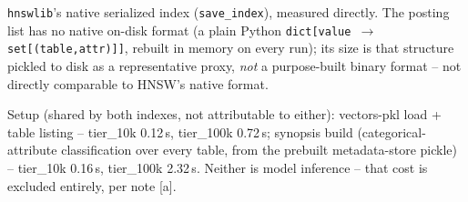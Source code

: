 \begin{table}[t]
\begin{threeparttable}
\begin{tablenotes}
  \texttt{hnswlib}'s native serialized index (\texttt{save\_index}), measured directly. The
  posting list has no native on-disk format (a plain Python
  \texttt{dict[value $\to$ set[(table,attr)]]}, rebuilt in memory on every run); its size is that
  structure pickled to disk as a representative proxy, \emph{not} a purpose-built binary format --
  not directly comparable to HNSW's native format.
\item Setup (shared by both indexes, not attributable to either): vectors-pkl load + table listing
  -- tier\_10k 0.12\,s, tier\_100k 0.72\,s; synopsis build (categorical-attribute classification
  over every table, from the prebuilt metadata-store pickle) -- tier\_10k 0.16\,s, tier\_100k
  2.32\,s. Neither is model inference -- that cost is excluded entirely, per note [a].
\end{tablenotes}
\end{threeparttable}
\end{table}
